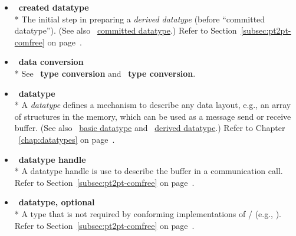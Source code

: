 \begin{itemize}
\label{glossary:created_datatype}
\item  ~\hypertarget{glossary:created_datatype}{\textbf{created datatype}} \\*
The initial step in preparing a \emph{derived datatype} (before ``committed datatype'').
(See also ~\hyperlink{glossary:committed_datatype}{committed datatype}.)
Refer to Section~\ref{subsec:pt2pt-comfree} on page~\pageref{subsec:pt2pt-comfree}.

\label{glossary:data_conversion}
\item  ~\hypertarget{glossary:data_conversion}{\textbf{data conversion}} \\*
See ~\hypertarget{glossary:type_conversion}{\textbf{type conversion}} and ~\hypertarget{glossary:representation_conversion}{\textbf{type conversion}}.

\label{glossary:datatype}
\item  ~\hypertarget{glossary:datatype}{\textbf{datatype}} \\*
A \emph{datatype} defines a mechanism to describe any data layout, e.g., an array of
structures in the memory, which can be used as a message send or receive buffer.
(See also ~\hyperlink{glossary:basic_datatype}{basic datatype} and
~\hyperlink{glossary:derived_datatype}{derived datatype}.)
Refer to Chapter ~\ref{chap:datatypes} on page~\pageref{chap:datatypes}.

\label{glossary:datatype_handle}
\item  ~\hypertarget{glossary:datatype_handle}{\textbf{datatype handle}} \\*
A datatype handle is use to describe the buffer in a communication call.
Refer to Section~\ref{subsec:pt2pt-comfree} on page~\pageref{subsec:pt2pt-comfree}.

\label{glossary:datatype_optional}
\item  ~\hypertarget{glossary:datatype_optional}{\textbf{datatype, optional}} \\*
A type that is not required by conforming implementations of \MPIIII/ (e.g., ).
Refer to Section~\ref{subsec:pt2pt-comfree} on page~\pageref{subsec:pt2pt-comfree}.


\end{itemize}
